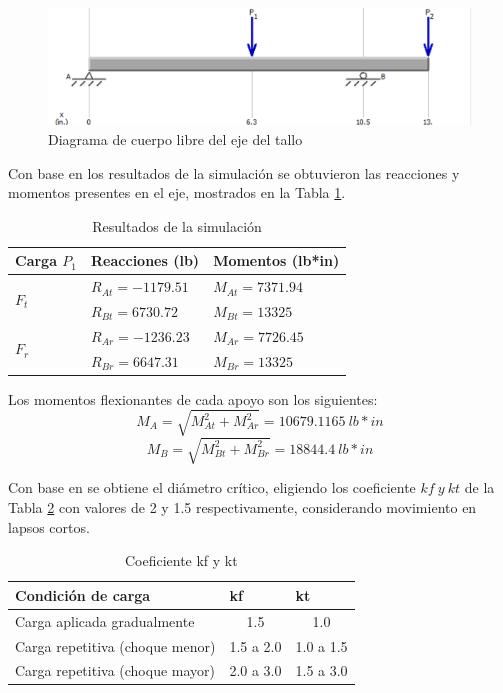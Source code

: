 \begin{figure}[H]
	\centering
	\includegraphics[width=\columnwidth]{imagenes/talloDCL}
	\caption{Diagrama de cuerpo libre del eje del tallo}
	\label{fig:tallo1}
\end{figure}

Con base en los resultados de la simulación se obtuvieron las reacciones y momentos presentes en el eje, mostrados en la Tabla \ref{tab:tallo1}.
\begin{table}[H]
	\centering
	\caption{Resultados de la simulación}
	\begin{tabular}{|l|l|l|}
		\hline
		\textbf{Carga $ P_1 $} & \textbf{Reacciones (lb)} & \textbf{Momentos (lb*in)} \\
		\hline \hline
		\multirow{2}[4]{*}{$ F_t $} & $ R_{At}=-1179.51 $ & $ M_{At}=7371.94 $ \\
		\cline{2-3}          & $ R_{Bt}=6730.72 $ & $ M_{Bt}=13325 $ \\
		\hline
		\multirow{2}[4]{*}{$ F_r $} & $ R_{Ar}=-1236.23 $ & $ M_{Ar}=7726.45 $ \\
		\cline{2-3}          & $ R_{Br}=6647.31 $ & $ M_{Br}=13325 $ \\
		\hline
	\end{tabular}%
	\label{tab:tallo1}%
\end{table}%

Los momentos flexionantes de cada apoyo son los siguientes:
\begin{equation}
M_A = \sqrt{M_{At}^2 + M_{Ar}^2} = 10679.1165\ lb*in
\end{equation}
\begin{equation}
M_B = \sqrt{M_{Bt}^2 + M_{Br}^2} = 18844.4\ lb*in
\end{equation}

Con base en \cite{DDA3} se obtiene el diámetro crítico, eligiendo los coeficiente $ kf\ y\ kt $ de la Tabla \ref{tab:coef} con valores de 2 y 1.5 respectivamente, considerando movimiento en lapsos cortos.
\begin{table}[H]
	\centering
	\caption{Coeficiente kf y kt}
	\begin{tabular}{|l|c|c|}
		\hline
		\textbf{Condición de carga} & \multicolumn{1}{l|}{\textbf{kf}} & \multicolumn{1}{l|}{\textbf{kt}} \\
		\hline \hline
		Carga aplicada gradualmente & 1.5   & 1.0 \\
		\hline
		Carga repetitiva (choque menor) & 1.5 a 2.0 & 1.0 a 1.5 \\
		\hline
		Carga repetitiva (choque mayor) & 2.0 a 3.0 & 1.5 a 3.0 \\
		\hline
	\end{tabular}%
	\label{tab:coef}%
\end{table}%

